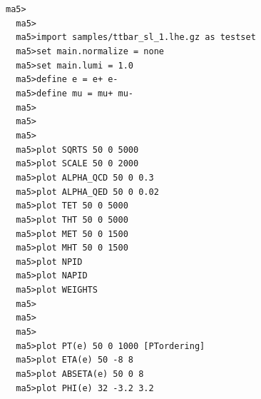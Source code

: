 \documentclass[a4paper, 10pt]{article}
\begin{document}
\texttt{ma5>\\
}
\texttt{ }\texttt{ }\texttt{ma5>\\
}
\texttt{ }\texttt{ }\texttt{ma5>import samples/\-ttbar\_sl\_1.lhe.gz as testset\\
}
\texttt{ }\texttt{ }\texttt{ma5>set main.normalize = none\\
}
\texttt{ }\texttt{ }\texttt{ma5>set main.lumi = 1.0\\
}
\texttt{ }\texttt{ }\texttt{ma5>define e = e+ e-\\
}
\texttt{ }\texttt{ }\texttt{ma5>define mu = mu+ mu-\\
}
\texttt{ }\texttt{ }\texttt{ma5>\\
}
\texttt{ }\texttt{ }\texttt{ma5>\\
}
\texttt{ }\texttt{ }\texttt{ma5>\\
}
\texttt{ }\texttt{ }\texttt{ma5>plot SQRTS     50 0 5000\\
}
\texttt{ }\texttt{ }\texttt{ma5>plot SCALE     50 0 2000\\
}
\texttt{ }\texttt{ }\texttt{ma5>plot ALPHA\_QCD 50 0 0.3\\
}
\texttt{ }\texttt{ }\texttt{ma5>plot ALPHA\_QED 50 0 0.02\\
}
\texttt{ }\texttt{ }\texttt{ma5>plot TET       50 0 5000\\
}
\texttt{ }\texttt{ }\texttt{ma5>plot THT       50 0 5000\\
}
\texttt{ }\texttt{ }\texttt{ma5>plot MET       50 0 1500\\
}
\texttt{ }\texttt{ }\texttt{ma5>plot MHT       50 0 1500\\
}
\texttt{ }\texttt{ }\texttt{ma5>plot NPID\\
}
\texttt{ }\texttt{ }\texttt{ma5>plot NAPID\\
}
\texttt{ }\texttt{ }\texttt{ma5>plot WEIGHTS\\
}
\texttt{ }\texttt{ }\texttt{ma5>\\
}
\texttt{ }\texttt{ }\texttt{ma5>\\
}
\texttt{ }\texttt{ }\texttt{ma5>\\
}
\texttt{ }\texttt{ }\texttt{ma5>plot PT(e)       50 0 1000 [PTordering]\\
}
\texttt{ }\texttt{ }\texttt{ma5>plot ETA(e)      50 -8 8\\
}
\texttt{ }\texttt{ }\texttt{ma5>plot ABSETA(e)   50 0 8\\
}
\texttt{ }\texttt{ }\texttt{ma5>plot PHI(e)      32 -3.2 3.2\\
}
\end{document}
